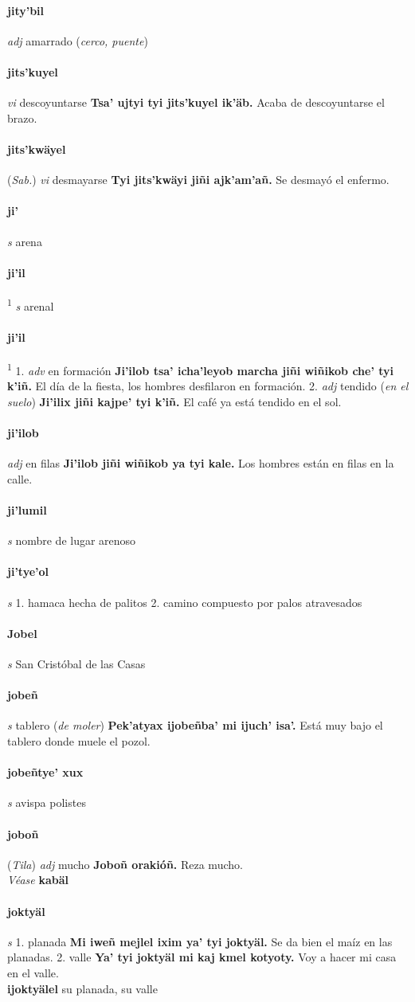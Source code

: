 \documentclass{scrbook}
\newcommand{\entry}[1]{\paragraph{#1}}
\newcommand{\onedefinition}[1]{#1.}
\newcommand{\defsuperscript}[1]{\textsuperscript{1}}
\newcommand{\partofspeech}[1]{\textit{#1}}
\newcommand{\spanishtranslation}[1]{#1}
\newcommand{\clarification}[1]{(\textit{#1})}
\newcommand{\cholexample}[1]{\textbf{#1}}
\newcommand{\exampletranslation}[1]{#1}
\newcommand{\alsosee}[1]{\\\textit{Véase} \textbf{#1}}
\newcommand{\relevantdialect}[1]{(\textit{#1})}
\newcommand{\secondaryentry}[1]{\\\textbf{#1}}
\newcommand{\secondtranslation}[1]{#1}
\begin{document}
\begin{multicols}{2}
\entry{jity'bil}
\partofspeech{adj}
\spanishtranslation{amarrado}
\clarification{cerco, puente}

\entry{jits'kuyel}
\partofspeech{vi}
\spanishtranslation{descoyuntarse}
\cholexample{Tsa' ujtyi tyi jits'kuyel ik'äb.}
\exampletranslation{Acaba de descoyuntarse el brazo.}

\entry{jits'kwäyel}
\relevantdialect{Sab.}
\partofspeech{vi}
\spanishtranslation{desmayarse}
\cholexample{Tyi jits'kwäyi jiñi ajk'am'añ.}
\exampletranslation{Se desmayó el enfermo.}

\entry{ji'}
\partofspeech{s}
\spanishtranslation{arena}

\entry{ji'il}
\defsuperscript{1}
\partofspeech{s}
\spanishtranslation{arenal}

\entry{ji'il}
\defsuperscript{2}
\onedefinition{1}
\partofspeech{adv}
\spanishtranslation{en formación}
\cholexample{Ji'ilob tsa' icha'leyob marcha jiñi wiñikob che' tyi k'iñ.}
\exampletranslation{El día de la fiesta, los hombres desfilaron en formación.}
\onedefinition{2}
\partofspeech{adj}
\spanishtranslation{tendido}
\clarification{en el suelo}
\cholexample{Ji'ilix jiñi kajpe' tyi k'iñ.}
\exampletranslation{El café ya está tendido en el sol.}

\entry{ji'ilob}
\partofspeech{adj}
\spanishtranslation{en filas}
\cholexample{Ji'ilob jiñi wiñikob ya tyi kale.}
\exampletranslation{Los hombres están en filas en la calle.}

\entry{ji'lumil}
\partofspeech{s}
\spanishtranslation{nombre de lugar arenoso}

\entry{ji'tye'ol}
\partofspeech{s}
\onedefinition{1}
\spanishtranslation{hamaca hecha de palitos}
\onedefinition{2}
\spanishtranslation{camino compuesto por palos atravesados}

\entry{Jobel}
\partofspeech{s}
\spanishtranslation{San Cristóbal de las Casas}

\entry{jobeñ}
\partofspeech{s}
\spanishtranslation{tablero}
\clarification{de moler}
\cholexample{Pek'atyax ijobeñba' mi ijuch' isa'.}
\exampletranslation{Está muy bajo el tablero donde muele el pozol.}

\entry{jobeñtye' xux}
\partofspeech{s}
\spanishtranslation{avispa polistes}

\entry{joboñ}
\relevantdialect{Tila}
\partofspeech{adj}
\spanishtranslation{mucho}
\cholexample{Joboñ orakióñ.}
\exampletranslation{Reza mucho.}
\alsosee{kabäl}

\entry{joktyäl}
\partofspeech{s}
\onedefinition{1}
\spanishtranslation{planada}
\cholexample{Mi iweñ mejlel ixim ya' tyi joktyäl.}
\exampletranslation{Se da bien el maíz en las planadas.}
\onedefinition{2}
\spanishtranslation{valle}
\cholexample{Ya' tyi joktyäl mi kaj kmel kotyoty.}
\exampletranslation{Voy a hacer mi casa en el valle.}
\secondaryentry{ijoktyälel}
\secondtranslation{su planada, su valle}


\end{multicols}
\end{document}
